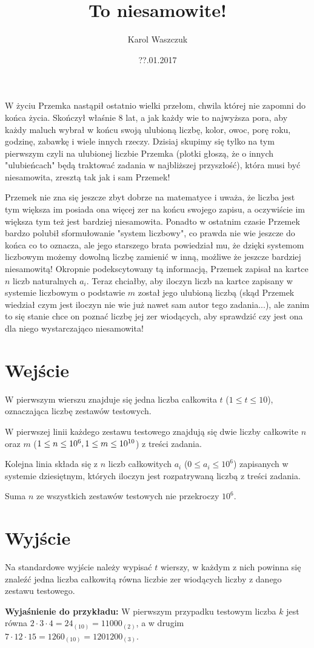 \documentclass[zad,zawodnik,utf8]{sinol}
\title{To niesamowite!}
\author{Karol Waszczuk} %
\date{??.01.2017}
\begin{document}
\begin{tasktext}%

W życiu Przemka nastąpił ostatnio wielki przełom, chwila której nie zapomni do końca życia. Skończył właśnie 8 lat, a jak każdy wie to najwyższa pora, aby każdy maluch wybrał w końcu swoją ulubioną liczbę, kolor, owoc, porę roku, godzinę, zabawkę i wiele innych rzeczy. Dzisiaj skupimy się tylko na tym pierwszym czyli na ulubionej liczbie Przemka (plotki głoszą, że o innych "ulubieńcach" będą traktować zadania w najbliższej przyszłość), która musi być niesamowita, zresztą tak jak i sam Przemek!

Przemek nie zna się jeszcze zbyt dobrze na matematyce i uważa, że liczba jest tym większa im posiada ona więcej zer na końcu swojego zapisu, a oczywiście im większa tym też jest bardziej niesamowita. Ponadto w ostatnim czasie Przemek bardzo polubił sformułowanie "system liczbowy", co prawda nie wie jeszcze do końca co to oznacza, ale jego starszego brata powiedział mu, że dzięki systemom liczbowym możemy dowolną liczbę zamienić w inną, możliwe że jeszcze bardziej niesamowitą! Okropnie podekscytowany tą informacją, Przemek zapisał na kartce $n$ liczb naturalnych $a_i$. Teraz chciałby, aby iloczyn liczb na kartce zapisany w systemie liczbowym o podstawie $m$ został jego ulubioną liczbą (skąd Przemek wiedział czym jest iloczyn nie wie już nawet sam autor tego zadania...), ale zanim to się stanie chce on poznać liczbę jej zer wiodących, aby sprawdzić czy jest ona dla niego wystarczająco niesamowita!

  \section{Wejście}
W pierwszym wierszu znajduje się jedna liczba całkowita $t$ ($1 \leq t \leq 10$), oznaczająca liczbę zestawów testowych.

W pierwszej linii każdego zestawu testowego znajdują się dwie liczby całkowite $n$ oraz $m$ ($1 \leq n \leq 10^6, \\ 1 \leq m \leq 10^{10}$) z treści zadania.

Kolejna linia składa się z $n$ liczb całkowitych $a_i$ ($0 \leq a_i \leq 10^6$) zapisanych w systemie dziesiętnym, których iloczyn jest rozpatrywaną liczbą z treści zadania.

Suma $n$ ze wszystkich zestawów testowych nie przekroczy $10^6$.

  \section{Wyjście}
Na standardowe wyjście należy wypisać $t$ wierszy, w każdym z nich powinna się znaleźć jedna liczba całkowitą równa liczbie zer wiodących liczby z danego zestawu testowego.

\makecompactexample

\medskip
\noindent
\textbf {Wyjaśnienie do przykładu:} W pierwszym przypadku testowym liczba $k$ jest równa $2 \cdot 3 \cdot 4 = 24_{(10)} = 11000_{(2)}$, a w drugim $7 \cdot 12 \cdot 15 = 1260_{(10)} = 1201200_{(3)}$.

\end{tasktext}
\end{document}
